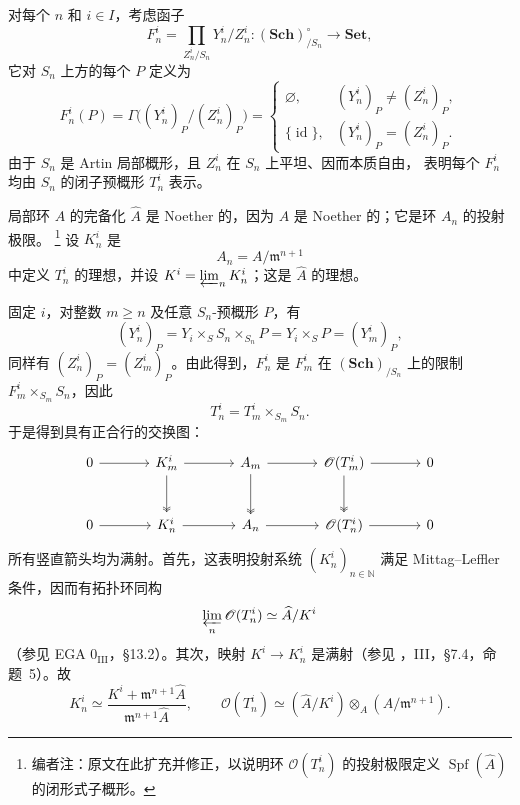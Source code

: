 对每个 \(n\) 和 \(i\in I\)，考虑函子
\[
  F_n^i
  =\prod_{Z_n^i/S_n}Y_n^i/Z_n^i:
  (\mathbf{Sch})_{/S_n}^{\circ}\longrightarrow\mathbf{Set},
\]
它对 \(S_n\) 上方的每个 \(P\) 定义为
\[
F_n^i(P)
=\Gamma\bigl((Y_n^i)_P/(Z_n^i)_P\bigr)
=
\begin{cases}
  \varnothing,&(Y_n^i)_P\ne(Z_n^i)_P,\\
  \{\operatorname{id}\},&(Y_n^i)_P=(Z_n^i)_P.
\end{cases}
\]
由于 \(S_n\) 是 Artin 局部概形，且 \(Z_n^i\) 在 \(S_n\) 上平坦、因而本质自由， 表明每个 \(F_n^i\) 均由 \(S_n\) 的闭子预概形 \(T_n^i\) 表示。

局部环 \(A\) 的完备化 \(\widehat A\) 是 Noether 的，因为 \(A\) 是 Noether 的；它是环 \(A_n\) 的投射极限。%
\footnote{编者注：原文在此扩充并修正，以说明环 \(\mathscr O(T_n^i)\) 的投射极限定义 \(\operatorname{Spf}(\widehat A)\) 的闭形式子概形。}
设 \(K_n^i\) 是
\[
  A_n=A/\mathfrak m^{n+1}
\]
中定义 \(T_n^i\) 的理想，并设 \(K^i=\varprojlim_nK_n^i\)；这是 \(\widehat A\) 的理想。

固定 \(i\)，对整数 \(m\geq n\) 及任意 \(S_n\)-预概形 \(P\)，有
\[
  (Y_n^i)_P
  =Y_i\times_SS_n\times_{S_n}P
  =Y_i\times_SP
  =(Y_m^i)_P,
\]
同样有 \((Z_n^i)_P=(Z_m^i)_P\)。由此得到，\(F_n^i\) 是 \(F_m^i\) 在 \((\mathbf{Sch})_{/S_n}\) 上的限制 \(F_m^i\times_{S_m}S_n\)，因此
\[
  T_n^i=T_m^i\times_{S_m}S_n.
\]
于是得到具有正合行的交换图：
\[
\begin{tikzcd}[column sep=large,row sep=large]
  0 \arrow[r] & K_m^i \arrow[r]\arrow[d,two heads]
    & A_m \arrow[r]\arrow[d,two heads]
    & \mathscr O(T_m^i) \arrow[r]\arrow[d,two heads] & 0\\
  0 \arrow[r] & K_n^i \arrow[r]
    & A_n \arrow[r]
    & \mathscr O(T_n^i) \arrow[r] & 0
\end{tikzcd}
\]
所有竖直箭头均为满射。首先，这表明投射系统 \((K_n^i)_{n\in\mathbb N}\) 满足 Mittag--Leffler 条件，因而有拓扑环同构
\[
  \varprojlim_n\mathscr O(T_n^i)
  \simeq\widehat A/K^i
\]
（参见 EGA \(0_{\mathrm{III}}\)，\S13.2）。其次，映射 \(K^i\to K_n^i\) 是满射（参见 ，III，\S7.4，命题~5）。故
\[
  K_n^i\simeq
  \frac{K^i+\mathfrak m^{n+1}\widehat A}
       {\mathfrak m^{n+1}\widehat A},
  \qquad
  \mathscr O(T_n^i)\simeq
  (\widehat A/K^i)\otimes_A(A/\mathfrak m^{n+1}).
\]

